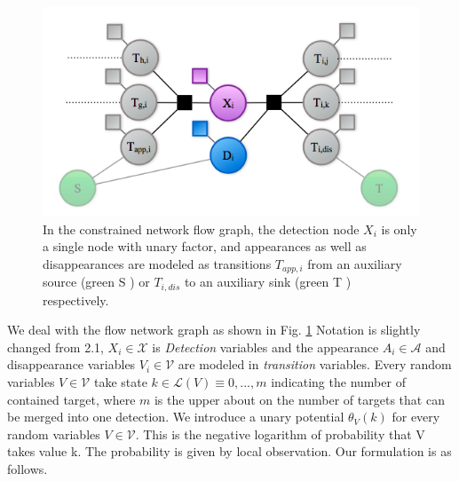 \documentclass[10pt,twocolumn,letterpaper]{article}
\begin{document}
\begin{figure}[t]
  \centering
  \includegraphics[width=0.8\linewidth]{model2.jpeg}
  \caption{In the constrained network flow graph, the detection node \(X_{i}\) is only a single node with unary factor, and appearances as well as disappearances are modeled as transitions \(T_{app,i}\) from an auxiliary source (green S ) or \(T_{i,dis}\) to an auxiliary sink (green T ) respectively.}
  \label{fig:ilpmodel}
\end{figure}

We deal with the flow network graph as shown in Fig. \ref{fig:ilpmodel} Notation is slightly changed from 2.1, $X_i \in \mathcal{X}$ is \textit{Detection} variables and the appearance $A_i \in \mathcal{A}$ and disappearance variables $V_i \in \mathcal{V}$ are modeled in \textit{transition} variables. Every random variables $V \in \mathcal{V}$ take state $k \in \mathcal{L}(V) \equiv {0, ...,m}$ indicating the number of contained target, where $m$ is the upper about on the number of targets that can be merged into one detection. We introduce a unary potential $\theta_{V}(k)$ for every random variables $V \in \mathcal{V}$. This is the negative logarithm of probability that V takes value k. The probability is given by local observation.
Our formulation is as follows.
\end{document}
